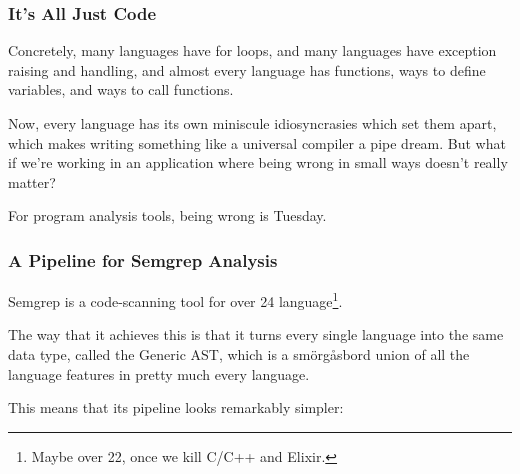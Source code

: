 \documentclass[aspectratio=169, handout]{beamer}
\begin{document}
 \begin{frame}[fragile]
   \frametitle{It's All Just Code}

   Concretely, many languages have for loops, and many languages have exception
   raising and handling, and almost every language has functions, ways to define
   variables, and ways to call functions.

   \pause
   \vspace{\fill}

   Now, every language has its own miniscule idiosyncrasies which set them apart,
   which makes writing something like a universal compiler a pipe dream. But what
   if we're working in an application where being wrong in small ways doesn't really
   matter?

   \pause
   \vspace{\fill}

   For program analysis tools, being wrong is Tuesday.
 \end{frame}

 \begin{frame}[fragile]
   \frametitle{A Pipeline for Semgrep Analysis}

   Semgrep is a code-scanning tool for over 24 language\footnote{Maybe over 22, once we
   kill C/C++ and Elixir.}.

   \pause
   \vspace{\fill}

   The way that it achieves this is that it turns every single language into the
   same data type, called the Generic AST, which is a smörgåsbord union of all
   the language features in pretty much every language.

   \pause
   \vspace{\fill}

   This means that its pipeline looks remarkably simpler:

   \begin{center}
   \end{center}
 \end{frame}
\end{document}
